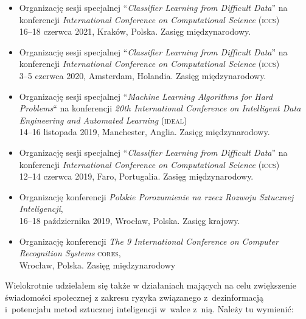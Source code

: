 \begin{itemize}
    \item {}Organizację sesji specjalnej “\emph{Classifier Learning from Difficult Data}” na konferencji \emph{International Conference on Computational Science} (\textsc{iccs})\\
    	16–18 czerwca 2021, Kraków, Polska. Zasięg międzynarodowy.
    \item {}Organizację sesji specjalnej “\emph{Classifier Learning from Difficult Data}” na konferencji \emph{International Conference on Computational Science} (\textsc{iccs})\\
    	3–5 czerwca 2020, Amsterdam, Holandia. Zasięg międzynarodowy.
    \item {} Organizację sesji specjalnej “\emph{Machine Learning Algorithms for Hard Problems}“ na konferencji \emph{20th International Conference on Intelligent Data Engineering and Automated Learning} (\textsc{ideal})\\
    	14–16 listopada 2019, Manchester, Anglia. Zasięg międzynarodowy.
    \item {}Organizację sesji specjalnej “\emph{Classifier Learning from Difficult Data}” na konferencji \emph{International Conference on Computational Science} (\textsc{iccs})\\
    	12–14 czerwca 2019, Faro, Portugalia. Zasięg międzynarodowy.
    \item {}Organizację konferencji \emph{Polskie Porozumienie na rzecz Rozwoju Sztucznej Inteligencji},\\
    	16–18 października 2019, Wrocław, Polska. Zasięg krajowy.
    \item {}Organizację konferencji \emph{The 9 International Conference on Computer Recognition Systems} \textsc{cores},\\
    	Wrocław, Polska. Zasięg międzynarodowy
\end{itemize}

Wielokrotnie udzielałem się także w działaniach mających na celu zwiększenie świadomości społecznej z zakresu ryzyka związanego z~dezinformacją i~potencjału metod sztucznej inteligencji w~walce z~nią. Należy tu wymienić:

